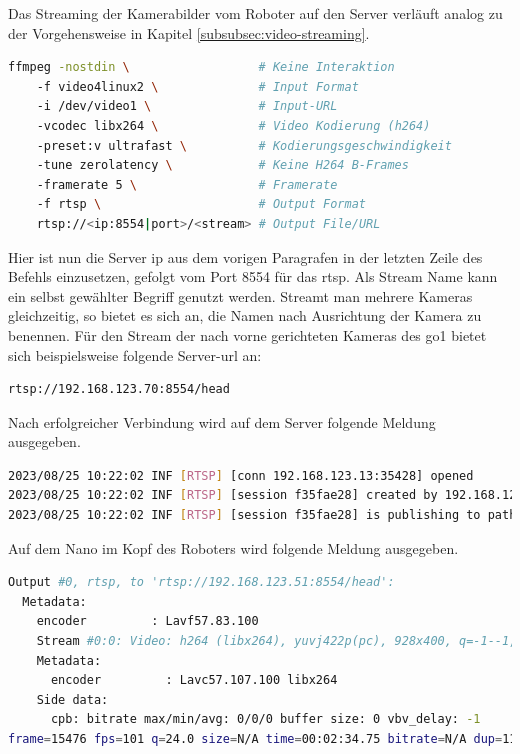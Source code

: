 
Das Streaming der Kamerabilder vom Roboter auf den Server verläuft analog zu der Vorgehensweise in Kapitel \ref{subsubsec:video-streaming}.

\begin{lstlisting}[language=Bash]
ffmpeg -nostdin \                  # Keine Interaktion
    -f video4linux2 \              # Input Format
    -i /dev/video1 \               # Input-URL
    -vcodec libx264 \              # Video Kodierung (h264)
    -preset:v ultrafast \          # Kodierungsgeschwindigkeit
    -tune zerolatency \            # Keine H264 B-Frames
    -framerate 5 \                 # Framerate
    -f rtsp \                      # Output Format
    rtsp://<ip:8554|port>/<stream> # Output File/URL
\end{lstlisting}

Hier ist nun die Server \gls{ip} aus dem vorigen Paragrafen in der letzten Zeile des Befehls einzusetzen, gefolgt vom Port
\num{8554} für das \gls{rtsp}.
Als Stream Name kann ein selbst gewählter Begriff genutzt werden.
Streamt man mehrere Kameras gleichzeitig, so bietet es sich an, die Namen nach Ausrichtung der Kamera zu benennen.
Für den Stream der nach vorne gerichteten Kameras des \gls{go1} bietet sich beispielsweise folgende Server-\gls{url} an:

\begin{lstlisting}[language=Bash]
rtsp://192.168.123.70:8554/head
\end{lstlisting}

\noindent Nach erfolgreicher Verbindung wird auf dem Server folgende Meldung ausgegeben.

\begin{lstlisting}[language=Bash]
2023/08/25 10:22:02 INF [RTSP] [conn 192.168.123.13:35428] opened
2023/08/25 10:22:02 INF [RTSP] [session f35fae28] created by 192.168.123.13:35428
2023/08/25 10:22:02 INF [RTSP] [session f35fae28] is publishing to path 'head', with TCP, 1 track (H264)
\end{lstlisting}

\noindent Auf dem Nano im Kopf des Roboters wird folgende Meldung ausgegeben.

\begin{lstlisting}[language=Bash]
Output #0, rtsp, to 'rtsp://192.168.123.51:8554/head':
  Metadata:
    encoder         : Lavf57.83.100
    Stream #0:0: Video: h264 (libx264), yuvj422p(pc), 928x400, q=-1--1, 100 fps, 90k tbn, 100 tbc
    Metadata:
      encoder         : Lavc57.107.100 libx264
    Side data:
      cpb: bitrate max/min/avg: 0/0/0 buffer size: 0 vbv_delay: -1
frame=15476 fps=101 q=24.0 size=N/A time=00:02:34.75 bitrate=N/A dup=11652 drop=0 speed=1.01x
\end{lstlisting}

